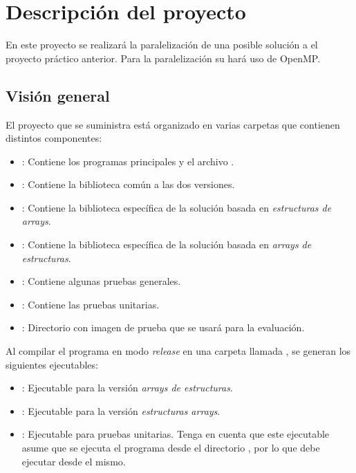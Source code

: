 \section{Descripción del proyecto}

En este proyecto se realizará la paralelización de una posible solución a
el proyecto práctico anterior. Para la paralelización su hará uso de
OpenMP.

\subsection{Visión general}

El proyecto que se suministra está organizado en varias carpetas que contienen
distintos componentes:

\begin{itemize}
  \item {}: Contiene los programas principales y el archivo
        .
  \item {}: Contiene la biblioteca común a las dos versiones.
  \item {}: Contiene la biblioteca específica de la solución basada en
        \emph{estructuras de arrays}.
  \item {}: Contiene la biblioteca específica de la solución basada en
        \emph{arrays de estructuras}.
  \item {}: Contiene algunas pruebas generales.
  \item {}: Contiene las pruebas unitarias.
  \item {}: Directorio con imagen de prueba que se usará para la evaluación.
\end{itemize}

Al compilar el programa en modo \emph{release} en una carpeta llamada ,
se generan los siguientes ejecutables:

\begin{itemize}
  \item {}: Ejecutable para la versión \emph{arrays de estructuras}.
  \item {}: Ejecutable para la versión \emph{estructuras arrays}.
  \item {}: Ejecutable para pruebas unitarias. Tenga en cuenta que este
        ejecutable asume que se ejecuta el programa desde el directorio ,
        por lo que debe ejecutar desde el mismo.
\end{itemize}

